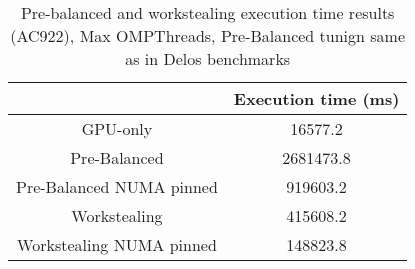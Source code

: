 \begin{table}[H]
  \centering
  \begin{tabular}{||c | c||} 
   \hline
    & Execution time (ms) \\ [0.5ex] 
   \hline\hline
   GPU-only & 16577.2 \\
   Pre-Balanced & 2681473.8 \\ 
   Pre-Balanced NUMA pinned & 919603.2 \\
   Workstealing & 415608.2 \\
   Workstealing NUMA pinned & 148823.8 \\ [1ex] 
   \hline
  \end{tabular}
  \caption{Pre-balanced and workstealing execution time results (AC922), Max OMPThreads, Pre-Balanced tunign same as in Delos benchmarks}
  \label{table:bench_ac922}
\end{table}